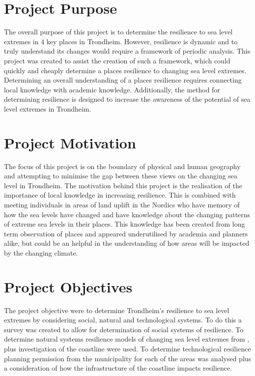 \paragraph{}

\section{Project Purpose}
The overall purpose of this project is to determine the resilience to sea level extremes in 4 key places in Trondheim. However, resilience is dynamic and to truly understand its changes would require a framework of periodic analysis. This project was created to assist the creation of such a framework, which could quickly and cheaply determine a places resilience to changing sea level extremes. Determining an overall understanding of a places resilience requires connecting local knowledge with academic knowledge. Additionally, the method for determining resilience is designed to increase the awareness of the potential of sea level extremes in Trondheim. 

\section{Project Motivation}
 The focus of this project is on the boundary of physical and human geography and attempting to minimise the gap between these views on the changing sea level in Trondheim. The motivation behind this project is the realisation of the importance of local knowledge in increasing resilience. This is combined with meeting individuals in areas of land uplift in the Nordics who have memory of how the sea levels have changed and have knowledge about the changing patterns of extreme sea levels in their places. This knowledge has been created from long term observation of places and appeared underutilised by academia and planners alike, but could be an helpful in the understanding of how areas will be impacted by the changing climate. 

\section{Project Objectives}
The project objective were to determine Trondheim's resilience to sea level extremes by considering social, natural and technological systems. To do this a survey was created to allow for determination of social systems of resilience. To determine natural systems resilience models of changing sea level extremes from \cite{kartverket_se_2020}, plus investigation of the coastline were used. To determine technological resilience planning permission from the municipality for each of the areas was analysed plus a consideration of how the infrastructure of the coastline impacts resilience.

